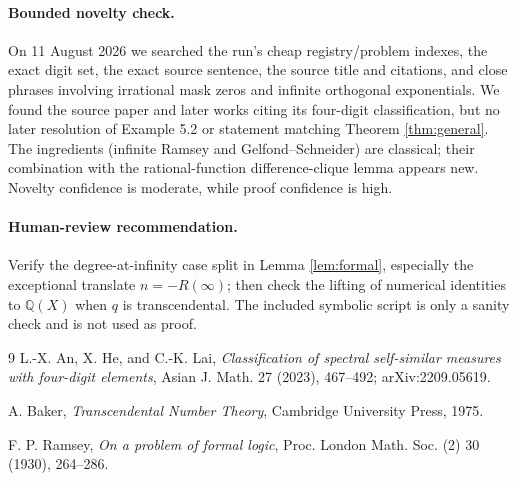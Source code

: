 \documentclass[11pt]{article}
\newcommand{\Q}{\mathbb Q}
\begin{document}
\paragraph{Bounded novelty check.}
On 11 August 2026 we searched the run's cheap registry/problem indexes, the
exact digit set, the exact source sentence, the source title and citations,
and close phrases involving irrational mask zeros and infinite orthogonal
exponentials.  We found the source paper and later works citing its four-digit
classification, but no later resolution of Example 5.2 or statement matching
Theorem \ref{thm:general}.  The ingredients (infinite Ramsey and
Gelfond--Schneider) are classical; their combination with the
rational-function difference-clique lemma appears new.  Novelty confidence is
moderate, while proof confidence is high.

\paragraph{Human-review recommendation.}
Verify the degree-at-infinity case split in Lemma \ref{lem:formal}, especially
the exceptional translate $n=-R(\infty)$; then check the lifting of numerical
identities to $\Q(X)$ when $q$ is transcendental.  The included symbolic
script is only a sanity check and is not used as proof.

\begin{thebibliography}{9}
L.-X. An, X. He, and C.-K. Lai,
\emph{Classification of spectral self-similar measures with four-digit
elements}, Asian J. Math. 27 (2023), 467--492; arXiv:2209.05619.

A. Baker,
\emph{Transcendental Number Theory},
Cambridge University Press, 1975.

F. P. Ramsey,
\emph{On a problem of formal logic},
Proc. London Math. Soc. (2) 30 (1930), 264--286.
\end{thebibliography}
\end{document}
